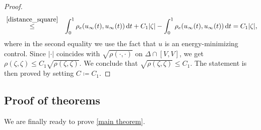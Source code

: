 \documentclass[a4paper,11pt,reqno]{amsart}
\theoremstyle{plain}
\theoremstyle{definition}
\newcommand{\id}{e}
\newcommand{\de}{\mathrm{d}}
\newcommand{\coloneq}{\coloneqq}
\begin{document}
\begin{proof}
\begin{eqnarray*}
 &\stackrel{\eqref{distance_square}}{\le}& \int^1_0 \rho_\id(u_\infty(t),u_\infty(t))\, \de t + C_1\lvert \zeta \rvert - \int^1_0 \rho_\id(u_\infty(t),u_\infty(t))\, \de t
 = C_1\lvert \zeta \rvert,
\end{eqnarray*}
where in the second equality we use the fact that $u$ is an energy-minimizing control. Since $\lvert \cdot \rvert$ coincides with $\sqrt{\rho(\cdot,\cdot)}$ on $\Delta \cap [V,V]$, we get $\rho(\zeta,\zeta) \le C_1 \sqrt{\rho(\zeta,\zeta)}$. We conclude that $\sqrt{\rho(\zeta,\zeta)} \le C_1$. The statement is then proved by setting $C \coloneq C_1$.
\end{proof}

\subsection{Proof of theorems} We are finally ready to prove \cref{main theorem}.
\end{document}
